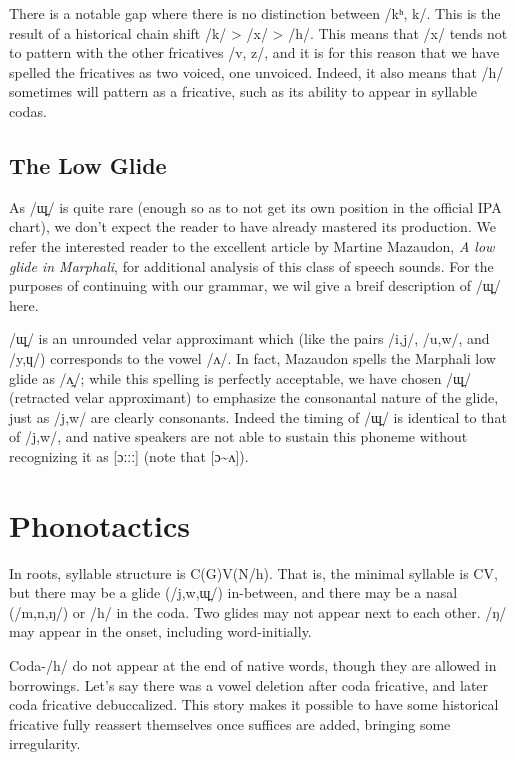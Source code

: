 \documentclass[12pt]{book} %
\begin{document}
There is a notable gap where there is no distinction between /kʰ, k/.
This is the result of a historical chain shift /k/ > /x/ > /h/.
This means that /x/ tends not to pattern with the other fricatives /v, z/, and it is for this reason that we have spelled the fricatives as two voiced, one unvoiced.
Indeed, it also means that /h/ sometimes will pattern as a fricative, such as its ability to appear in syllable codas.

\subsection{The Low Glide}
As /ɰ̠/ is quite rare (enough so as to not get its own position in the official IPA chart), we don't expect the reader to have already mastered its production.
We refer the interested reader to the excellent article by Martine Mazaudon, \textit{A low glide in Marphali}, for additional analysis of this class of speech sounds.
For the purposes of continuing with our grammar, we wil give a breif description of /ɰ̠/ here.

/ɰ̠/ is an unrounded velar approximant which (like the pairs /i,j/, /u,w/, and /y,ɥ/) corresponds to the vowel /ʌ/.
In fact, Mazaudon spells the Marphali low glide as /ʌ̯/; while this spelling is perfectly acceptable, we have chosen /ɰ̠/ (retracted velar approximant) to emphasize the consonantal nature of the glide, just as /j,w/ are clearly consonants.
Indeed the timing of /ɰ̠/ is identical to that of /j,w/, and native speakers are not able to sustain this phoneme without recognizing it as [ɔːːː] (note that [ɔ\textasciitilde{}ʌ]).

\section{Phonotactics}

In roots, syllable structure is C(G)V(N/h).
That is, the minimal syllable is CV, but there may be a glide (/j,w,ɰ̠/) in-between, and there may be a nasal (/m,n,ŋ/) or /h/ in the coda.
Two glides may not appear next to each other.
/ŋ/ may appear in the onset, including word-initially.

Coda-/h/ do not appear at the end of native words, though they are allowed in borrowings. {\color{cyan}Let's say there was a vowel deletion after coda fricative, and later coda fricative debuccalized.
This story makes it possible to have some historical fricative fully reassert themselves once suffices are added, bringing some irregularity.}
\end{document}
